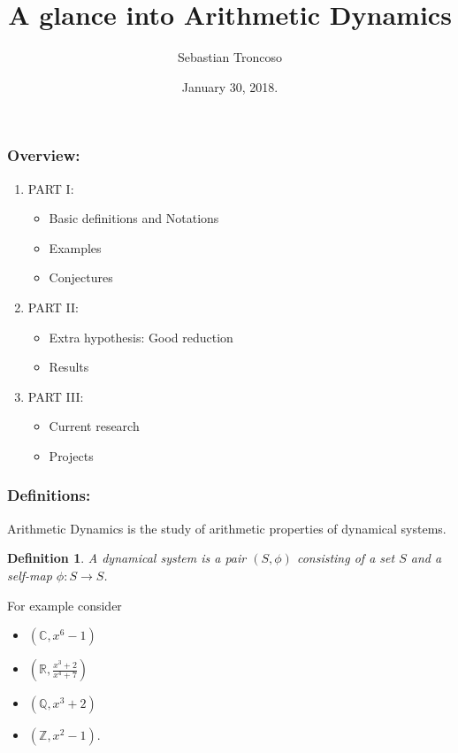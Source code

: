 \documentclass{beamer}
\title[Arithmetic Dynamics]{A glance into Arithmetic Dynamics}
\author[Sebastian Troncoso]{Sebastian Troncoso}
\date[January 30, 2018.]{ January 30, 2018. \\ \vspace{1cm} }
\def\CC{{\mathbb C}}
\def\QQ{{\mathbb Q}}
\def\RR{{\mathbb R}}
\def\ZZ{{\mathbb Z}}
\theoremstyle{thmstyle}
\newtheorem*{mydef}{Definition}
\theoremstyle{thmstyle}
\theoremstyle{thmstyle}
\theoremstyle{mystyle}
\theoremstyle{qstnstyle}
\begin{document}
\begin{frame}
\titlepage
\end{frame}

\begin{frame}
\frametitle{Overview:}

\begin{enumerate}
\item PART I: 
\begin{itemize}
\item Basic definitions and Notations
\item Examples
\item Conjectures
\end{itemize}


\item PART II:
\begin{itemize}
\item Extra hypothesis: Good reduction
\item Results
\end{itemize}
\item PART III:

\begin{itemize}
\item Current research
\item Projects
\end{itemize}
\end{enumerate}



\end{frame}

\begin{frame}
\frametitle{Definitions:}
Arithmetic Dynamics is the study of arithmetic properties of dynamical systems. 

\pause\vspace{5mm}

\begin{mydef}
A dynamical system is a pair $(S,\phi)$ consisting of a set $S$ and a self-map $\phi:S\to S$.
\end{mydef}

\pause\vspace{3mm}
For example consider 
\begin{itemize}
\item $(\CC,x^6-1)$
\item $\displaystyle(\RR,\frac{x^3+2}{x^4+7})$
\item $(\QQ,x^3+2)$
\item $(\ZZ,x^2-1)$.
\end{itemize}

 
\end{frame}
\end{document}
